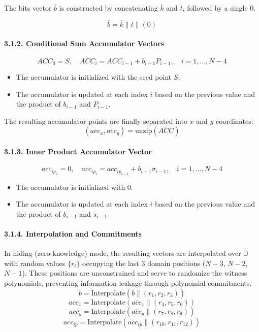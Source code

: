\documentclass[
]{article}
\providecommand{\tightlist}{%
  \setlength{\itemsep}{0pt}\setlength{\parskip}{0pt}}
\begin{document}
The bits vector \(\overline{b}\) is constructed by concatenating
\(\overline{k}\) and \(\overline{t}\), followed by a single 0.

\[\overline{b} = \overline{k} \| \overline{t} \| (0)\]

\paragraph{3.1.2. Conditional Sum Accumulator
Vectors}\label{conditional-sum-accumulator-vectors}

\[
ACC_0 = S, \quad ACC_i = ACC_{i-1} + b_{i-1}P_{i-1}, \quad i = 1, \ldots, N-4
\]

\begin{itemize}
\tightlist
\item
  The accumulator is initialized with the seed point \(S\).
\item
  The accumulator is updated at each index \(i\) based on the previous
  value and the product of \(b_{i-1}\) and \(P_{i-1}\).
\end{itemize}

The resulting accumulator points are finally separated into \(x\) and
\(y\) coordinates: \[
(\overline{acc}_x, \overline{acc}_y) = \text{unzip}(\overline{ACC})
\]

\paragraph{3.1.3. Inner Product Accumulator
Vector}\label{inner-product-accumulator-vector}

\[
acc_{ip_0} = 0, \quad acc_{ip_i} = acc_{ip_{i-1}} + b_{i-1}\sigma_{i-1}, \quad i = 1, \ldots, N-4
\]

\begin{itemize}
\tightlist
\item
  The accumulator is initialized with \(0\).
\item
  The accumulator is updated at each index \(i\) based on the previous
  value and the product of \(b_{i-1}\) and \(s_{i-1}\)
\end{itemize}

\paragraph{3.1.4. Interpolation and
Commitments}\label{interpolation-and-commitments}

In hiding (zero-knowledge) mode, the resulting vectors are interpolated
over \(\mathbb{D}\) with random values \(\{r_i\}\) occupying the last 3
domain positions (\(N-3\), \(N-2\), \(N-1\)). These positions are
unconstrained and serve to randomize the witness polynomials, preventing
information leakage through polynomial commitments.
\[b = \text{Interpolate}(\overline{b} \| (r_1, r_2, r_3))\]
\[acc_x = \text{Interpolate}(\overline{acc}_x \| (r_4, r_5, r_6))\]
\[acc_y = \text{Interpolate}(\overline{acc}_y \| (r_7, r_8, r_9))\]
\[acc_{ip} = \text{Interpolate}(\overline{acc}_{ip} \| (r_{10}, r_{11}, r_{12}))\]
\end{document}
